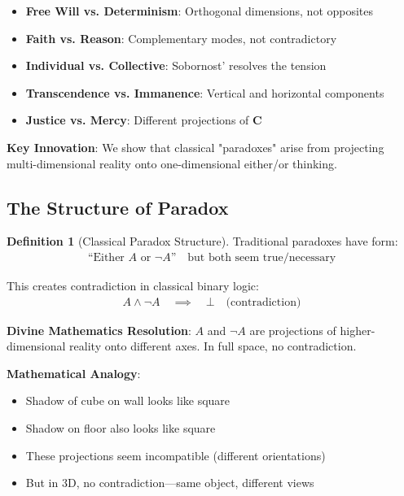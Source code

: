 \documentclass[11pt,a4paper]{article}
\theoremstyle{definition}
\newtheorem{definition}{Definition}[section]
\theoremstyle{remark}
\begin{document}
\begin{enumerate}
\begin{mdframed}[backgroundcolor=cyan!5,linewidth=2pt]
\begin{itemize}[nosep]
    \item \textbf{Free Will vs. Determinism}: Orthogonal dimensions, not opposites
    \item \textbf{Faith vs. Reason}: Complementary modes, not contradictory
    \item \textbf{Individual vs. Collective}: Sobornost' resolves the tension
    \item \textbf{Transcendence vs. Immanence}: Vertical and horizontal components
    \item \textbf{Justice vs. Mercy}: Different projections of \(\mathbf{C}\)
\end{itemize}

\textbf{Key Innovation}: We show that classical "paradoxes" arise from projecting multi-dimensional reality onto one-dimensional either/or thinking.
\end{mdframed}

\subsection{The Structure of Paradox}

\begin{definition}[Classical Paradox Structure]
Traditional paradoxes have form:
\begin{align}
\text{``Either } A \text{ or } \neg A\text{''} \quad \text{but both seem true/necessary}
\end{align}

This creates contradiction in classical binary logic:
\begin{align}
A \land \neg A \quad \implies \quad \bot \quad \text{(contradiction)}
\end{align}

\textbf{Divine Mathematics Resolution}: \(A\) and \(\neg A\) are projections of higher-dimensional reality onto different axes. In full space, no contradiction.

\textbf{Mathematical Analogy}: 
\begin{itemize}
    \item Shadow of cube on wall looks like square
    \item Shadow on floor also looks like square
    \item These projections seem incompatible (different orientations)
    \item But in 3D, no contradiction—same object, different views
\end{itemize}
\end{definition}


\end{enumerate}
\end{document}
